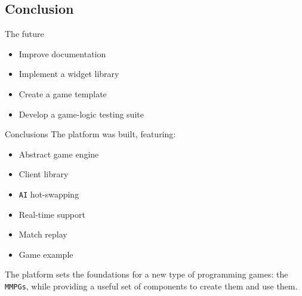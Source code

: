 \documentclass{beamer}
\begin{document}
\subsection{Conclusion}
\begin{frame}{The future}
\begin{itemize}
\item
Improve documentation
\item
Implement a widget library
\item
Create a game template
\item
Develop a game-logic testing suite
\end{itemize}
\end{frame}
\begin{frame}{Conclusions}
The platform was built, featuring:
\begin{itemize}
\item
Abstract game engine
\item
Client library
\item
\texttt{AI} hot-swapping
\item
Real-time support
\item
Match replay
\item
Game example
\end{itemize}
The platform sets the foundations for a new type of programming games: the \texttt{MMPGs}, while providing a useful set of
    components to create them and use them.
\end{frame}
\end{document}
